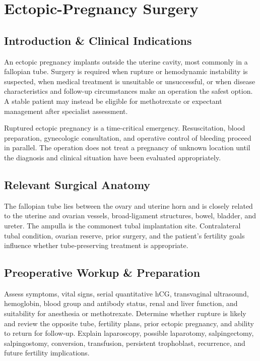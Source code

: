 \chapter{Ectopic-Pregnancy Surgery}

\section*{Introduction \& Clinical Indications}
An ectopic pregnancy implants outside the uterine cavity, most commonly in a fallopian tube. Surgery is required when rupture or hemodynamic instability is suspected, when medical treatment is unsuitable or unsuccessful, or when disease characteristics and follow-up circumstances make an operation the safest option. A stable patient may instead be eligible for methotrexate or expectant management after specialist assessment.

Ruptured ectopic pregnancy is a time-critical emergency. Resuscitation, blood preparation, gynecologic consultation, and operative control of bleeding proceed in parallel. The operation does not treat a pregnancy of unknown location until the diagnosis and clinical situation have been evaluated appropriately.

\section*{Relevant Surgical Anatomy}
The fallopian tube lies between the ovary and uterine horn and is closely related to the uterine and ovarian vessels, broad-ligament structures, bowel, bladder, and ureter. The ampulla is the commonest tubal implantation site. Contralateral tubal condition, ovarian reserve, prior surgery, and the patient’s fertility goals influence whether tube-preserving treatment is appropriate.

\section*{Preoperative Workup \& Preparation}
Assess symptoms, vital signs, serial quantitative hCG, transvaginal ultrasound, hemoglobin, blood group and antibody status, renal and liver function, and suitability for anesthesia or methotrexate. Determine whether rupture is likely and review the opposite tube, fertility plans, prior ectopic pregnancy, and ability to return for follow-up. Explain laparoscopy, possible laparotomy, salpingectomy, salpingostomy, conversion, transfusion, persistent trophoblast, recurrence, and future fertility implications.

